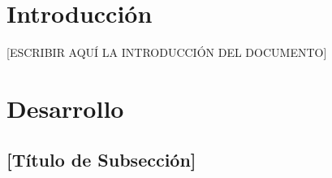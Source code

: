 \documentclass[12pt]{article}
\begin{document}


\newpage
{}               %
\tableofcontents
\newpage

\pagestyle{fancy}                   %

\section{Introducción}

 [ESCRIBIR AQUÍ LA INTRODUCCIÓN DEL DOCUMENTO]


\section{Desarrollo}

\subsection{[Título de Subsección]}
\end{document}
